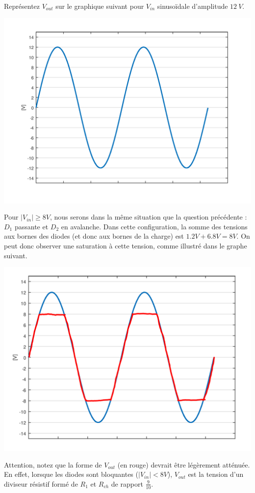 \documentclass{../template/tp}
\begin{document}
\Question
{
    Représentez $ V_{out} $ sur le graphique suivant pour  $ V_{in} $ sinusoïdale d'amplitude $ 12~V $.
    
    \includegraphics[width=.8\textwidth]{sinus.png}
    

}{

    Pour $|V_{in}| \geq 8V$, nous serons dans la même situation que la question précédente : $D_1$ passante et $D_2$ en avalanche.
    Dans cette configuration, la somme des tensions aux bornes des diodes (et donc aux bornes de la charge) est $1.2 V + 6.8 V = 8 V$.
    On peut donc observer une saturation à cette tension, comme illustré dans le graphe suivant.

    \begin{center}
    \includegraphics[width=.8\textwidth]{sinus_correction.png}
    \end{center}

    Attention, notez que la forme de $V_{out}$ (en rouge) devrait être légèrement atténuée.
    En effet, lorsque les diodes sont bloquantes ($|V_{in}| < 8 V$), $V_{out}$ est la tension d'un diviseur résistif formé de $R_1$ et $R_{ch}$ de rapport $\frac{9}{10}$.
}
\end{document}
